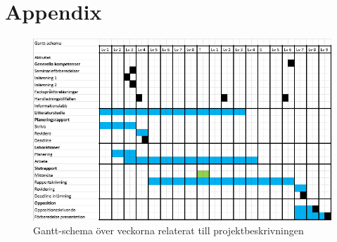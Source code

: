 \newpage
\appendix
\section{Appendix} \label{appendix}
\begin{figure}[H]
    \centering
    \includegraphics[scale=0.8]{Ganttliten.PNG}
    \caption{Gantt-schema över veckorna relaterat till projektbeskrivningen}
    \label{fig:Ganttliten}
\end{figure}

